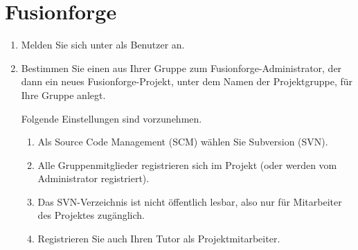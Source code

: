 \section*{Fusionforge}
\begin{enumerate}
\item Melden Sie sich unter  als Benutzer an.
\item Bestimmen Sie einen aus Ihrer Gruppe zum Fusionforge-Administrator, der dann ein neues Fusionforge-Projekt, unter dem Namen der Projektgruppe, für Ihre Gruppe anlegt.

Folgende Einstellungen sind vorzunehmen.
\begin{enumerate}[label=\alph*)]
\item Als Source Code Management (SCM) wählen Sie Subversion (SVN).
\item Alle Gruppenmitglieder registrieren sich im Projekt (oder werden vom Administrator registriert).
\item Das SVN-Verzeichnis ist nicht öffentlich lesbar, also nur für Mitarbeiter des Projektes zugänglich.
\item Registrieren Sie auch Ihren Tutor als Projektmitarbeiter.
\end{enumerate}
\end{enumerate}